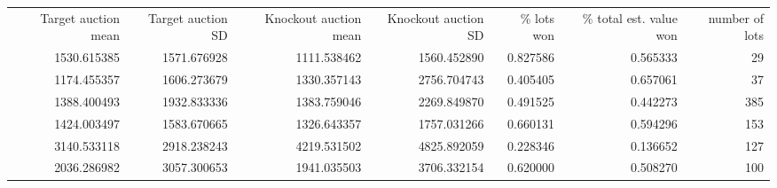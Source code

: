 \begin{tabular}{rrrrrrr}
\toprule
 Target auction mean &  Target auction SD &  Knockout auction mean &  Knockout auction SD &  \% lots won &  \% total est. value won &  number of lots \\
         1530.615385 &        1571.676928 &            1111.538462 &          1560.452890 &    0.827586 &                0.565333 &              29 \\
\midrule
         1174.455357 &        1606.273679 &            1330.357143 &          2756.704743 &    0.405405 &                0.657061 &              37 \\
         1388.400493 &        1932.833336 &            1383.759046 &          2269.849870 &    0.491525 &                0.442273 &             385 \\
         1424.003497 &        1583.670665 &            1326.643357 &          1757.031266 &    0.660131 &                0.594296 &             153 \\
         3140.533118 &        2918.238243 &            4219.531502 &          4825.892059 &    0.228346 &                0.136652 &             127 \\
         2036.286982 &        3057.300653 &            1941.035503 &          3706.332154 &    0.620000 &                0.508270 &             100 \\
\bottomrule
\end{tabular}
